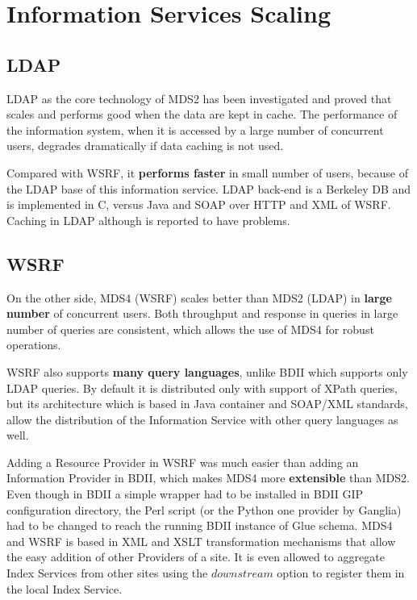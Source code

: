 \section{Information Services Scaling}

\subsection{LDAP}

LDAP as the core technology of MDS2 has been investigated \cite{zhang2004performance} and proved that scales and performs good when the data are kept in cache. The performance of the information system, when it is accessed by a large number of concurrent users, degrades dramatically if data caching is not used.

Compared with WSRF, it {\bf performs faster} \cite{schopf2006monitoring} in small number of users, because of the LDAP base of this information service. LDAP back-end is a Berkeley DB and is implemented in C, versus Java and SOAP over HTTP and XML of WSRF. Caching in LDAP although is reported to have problems.

\subsection{WSRF}

On the other side, MDS4 (WSRF) scales better than MDS2 (LDAP) in {\bf large number} of concurrent users. Both throughput and response in queries in large number of queries are consistent, which allows the use of MDS4 for robust operations.

WSRF also supports {\bf many query languages}, unlike BDII which supports only LDAP queries. By default it is distributed only with support of XPath queries, but its architecture which is based in Java container and SOAP/XML standards, allow the distribution of the Information Service with other query languages as well.

Adding a Resource Provider in WSRF was much easier than adding an Information Provider in BDII, which makes MDS4 more {\bf extensible} than MDS2. Even though in BDII a simple wrapper had to be installed in BDII GIP configuration directory, the Perl script (or the Python one provider by Ganglia) had to be changed to reach the running BDII instance of Glue schema. MDS4 and WSRF is based in XML and XSLT transformation mechanisms that allow the easy addition of other Providers of a site. It is even allowed to aggregate Index Services from other sites using the $downstream$ option to register them in the local Index Service.

